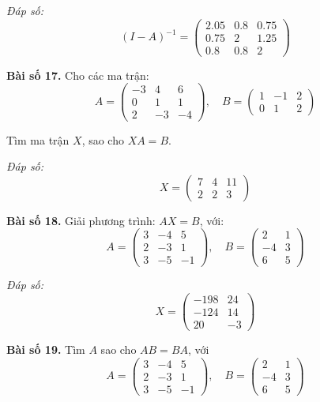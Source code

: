         \textit{Đáp số:}
        \[
        (I - A)^{-1} = \begin{pmatrix}
        2.05 & 0.8 & 0.75 \\
        0.75 & 2 & 1.25 \\
        0.8 & 0.8 & 2
        \end{pmatrix}
        \]
        
        \textbf{Bài số 17.} Cho các ma trận:
        \[
        A = \begin{pmatrix}
        -3 & 4 & 6 \\
        0 & 1 & 1 \\
        2 & -3 & -4
        \end{pmatrix}, \quad B = \begin{pmatrix}
        1 & -1 & 2 \\
        0 & 1 & 2
        \end{pmatrix}
        \]
        
        Tìm ma trận \(X\), sao cho \(XA = B\).
        
        \textit{Đáp số:}
        \[
        X = \begin{pmatrix}
        7 & 4 & 11 \\
        2 & 2 & 3
        \end{pmatrix}
        \]
        
        \textbf{Bài số 18.} Giải phương trình: \(AX = B\), với:
        \[
A = \begin{pmatrix}
3 & -4 & 5 \\
2 & -3 & 1 \\
3 & -5 & -1
\end{pmatrix}, \quad
B = \begin{pmatrix}
2 & 1 \\
-4 & 3 \\
6 & 5
\end{pmatrix}
\]

\textit{Đáp số:}
\[
X = \begin{pmatrix}
-198 & 24 \\
-124 & 14 \\
20 & -3
\end{pmatrix}
\]

        \textbf{Bài số 19.} Tìm \(A\) sao cho \(AB = BA\), với
        \[
        A = \begin{pmatrix}
        3 & -4 & 5 \\
        2 & -3 & 1 \\
        3 & -5 & -1
        \end{pmatrix}, \quad B = \begin{pmatrix}
        2 & 1 \\
        -4 & 3 \\
        6 & 5
        \end{pmatrix}
        \]
        
